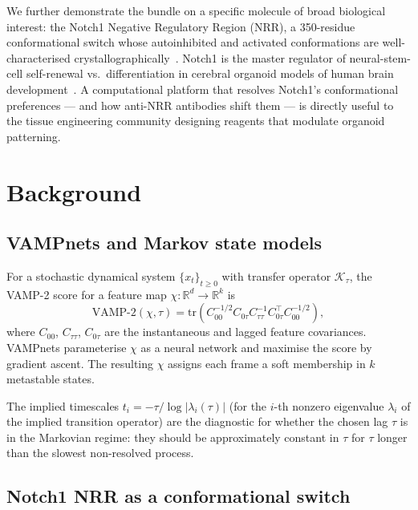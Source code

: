 \documentclass[11pt]{article}
\begin{document}
We further demonstrate the bundle on a specific molecule of broad
biological interest: the Notch1 Negative Regulatory Region (NRR), a
350-residue conformational switch whose autoinhibited and activated
conformations are well-characterised
crystallographically~\cite{gordon2007nrr,tiyanont2011exposure}. Notch1
is the master regulator of neural-stem-cell self-renewal vs.\
differentiation in cerebral organoid models of human brain
development~\cite{lancaster2013organoids,imayoshi2014bhlh,bagley2017fused}.
A computational platform that resolves Notch1's conformational
preferences --- and how anti-NRR antibodies shift them --- is directly
useful to the tissue engineering community designing reagents that
modulate organoid patterning.

\section{Background}

\subsection{VAMPnets and Markov state models}

For a stochastic dynamical system $\{x_t\}_{t \ge 0}$ with transfer
operator $\mathcal{K}_\tau$, the VAMP-2 score for a feature map
$\chi : \mathbb{R}^d \to \mathbb{R}^k$ is
\begin{equation}
  \mathrm{VAMP\text{-}2}(\chi, \tau)
  = \mathrm{tr}\left( C_{00}^{-1/2} C_{0\tau} C_{\tau\tau}^{-1}
                      C_{0\tau}^\top C_{00}^{-1/2} \right),
\end{equation}
where $C_{00}$, $C_{\tau\tau}$, $C_{0\tau}$ are the instantaneous and
lagged feature covariances. VAMPnets parameterise $\chi$ as a neural
network and maximise the score by gradient ascent. The resulting
$\chi$ assigns each frame a soft membership in $k$ metastable states.

The implied timescales
$t_i = -\tau / \log |\lambda_i(\tau)|$ (for the $i$-th nonzero
eigenvalue $\lambda_i$ of the implied transition operator) are the
diagnostic for whether the chosen lag $\tau$ is in the Markovian regime:
they should be approximately constant in $\tau$ for $\tau$ longer than
the slowest non-resolved process.

\subsection{Notch1 NRR as a conformational switch}
\end{document}
